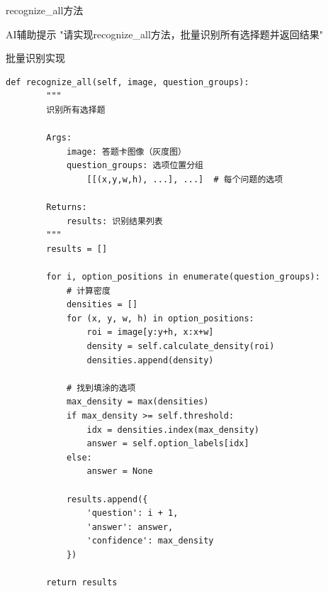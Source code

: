 \begin{frame}[fragile]{recognize\_all方法}
    \begin{block}{AI辅助提示}
        \aihint{} "请实现recognize_all方法，批量识别所有选择题并返回结果"
    \end{block}

    \begin{block}{批量识别实现}
    \begin{lstlisting}[basicstyle=\ttfamily\scriptsize]
    def recognize_all(self, image, question_groups):
        """
        识别所有选择题

        Args:
            image: 答题卡图像（灰度图）
            question_groups: 选项位置分组
                [[(x,y,w,h), ...], ...]  # 每个问题的选项

        Returns:
            results: 识别结果列表
        """
        results = []

        for i, option_positions in enumerate(question_groups):
            # 计算密度
            densities = []
            for (x, y, w, h) in option_positions:
                roi = image[y:y+h, x:x+w]
                density = self.calculate_density(roi)
                densities.append(density)

            # 找到填涂的选项
            max_density = max(densities)
            if max_density >= self.threshold:
                idx = densities.index(max_density)
                answer = self.option_labels[idx]
            else:
                answer = None

            results.append({
                'question': i + 1,
                'answer': answer,
                'confidence': max_density
            })

        return results
    \end{lstlisting}
    \end{block}
\end{frame}

